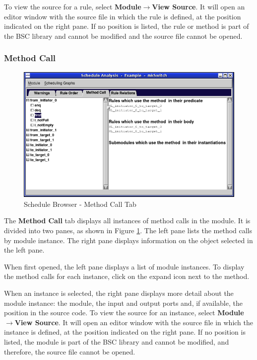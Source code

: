 \documentclass{article}
\begin{document}
To view the source for a rule, select {\bf Module$\rightarrow$View Source}.  It
will open an editor window with the source file in which the rule is
defined,  at the position indicated on the right pane.  If no
position is listed, the rule or method is part of the BSC library and
cannot be modified and the source file cannot be opened.


\subsubsection{Method Call}

\begin{figure}[ht]
\begin{center}
\includegraphics[width = 3.5 in]{figures/schedule-methodcall}
\caption{Schedule Browser - Method Call Tab}
\label{fig-methodcall}
\end{center}
\end{figure}

The {\bf Method Call} tab displays all instances of method calls in
the module.  It is divided into two panes,
as shown in Figure \ref{fig-methodcall}.  The left pane lists the
method calls by module instance.  The right pane displays information
on the object selected in the left pane.

When first opened, the left pane displays a list of module instances.
To display the method calls for each instance, click on the expand
icon next to the method.

When an instance is selected, the right pane
displays more detail about the module instance: the module,  the input and output ports and, if
available, the position  in the source code.
To view the source for an instance, select {\bf Module$\rightarrow$View Source}.  It
will open an editor window with the source file in which the instance is
defined,  at the position indicated on the right pane.  If no
position is listed, the module is part of the BSC library and
cannot be modified, and therefore,  the source file cannot be opened.
\end{document}
